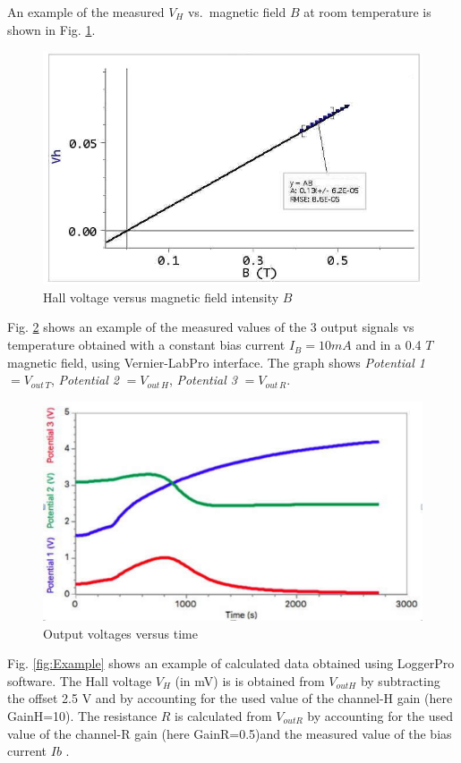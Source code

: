 \documentclass[]{book}
\begin{document}
An example of the measured \(V_H\) vs.~magnetic field \(B\) at room
temperature is shown in Fig. \ref{fig:HallvsIb}.

\begin{figure}

{\centering \includegraphics[width=0.65\linewidth]{Assets/Figures/Vh_vs_B} 

}

\caption{Hall voltage versus magnetic field intensity $B$}\label{fig:HallvsIb}
\end{figure}

Fig. \ref{fig:Output-voltages-versus-time} shows an example of the
measured values of the 3 output signals vs temperature obtained with a
constant bias current \(I_B=10mA\) and in a 0.4 \(T\) magnetic field,
using Vernier-LabPro interface. The graph shows \emph{Potential 1}
\(= V_{out \, T}\), \emph{Potential 2} \(= V_{out \,H}\),
\emph{Potential 3} \(= V_{out \, R}\).

\begin{figure}

{\centering \includegraphics[width=0.65\linewidth]{Assets/Figures/Out_vs_time} 

}

\caption{Output voltages versus time}\label{fig:Output-voltages-versus-time}
\end{figure}

Fig. \ref{fig:Example} shows an example of calculated data obtained
using LoggerPro software. The Hall voltage \(V_{H}\) (in mV) is is
obtained from \(V_{outH}\) by subtracting the offset 2.5 V and by
accounting for the used value of the channel-H gain (here GainH=10). The
resistance \(R\) is calculated from \(V_{outR}\) by accounting for the
used value of the channel-R gain (here GainR=0.5)and the measured value
of the bias current \(Ib\) .
\end{document}
